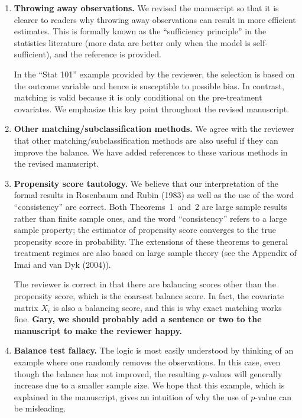 \documentclass[11pt]{article}
\begin{document}
\begin{enumerate}
\item {\bf Throwing away observations.} We revised the manuscript so
  that it is clearer to readers why throwing away observations can
  result in more efficient estimates. This is formally known as the
  ``sufficiency principle'' in the statistics literature (more data
  are better only when the model is self-sufficient), and the
  reference is provided.

  In the ``Stat 101'' example provided by the reviewer, the selection
  is based on the outcome variable and hence is susceptible to
  possible bias. In contrast, matching is valid because it is only
  conditional on the pre-treatment covariates. We emphasize this key
  point throughout the revised manuscript.

\item {\bf Other matching/subclassification methods.} We agree with
  the reviewer that other matching/subclassification methods are also
  useful if they can improve the balance. We have added references to
  these various methods in the revised manuscript.

\item {\bf Propensity score tautology.} We believe that our
  interpretation of the formal results in Rosenbaum and Rubin (1983)
  as well as the use of the word ``consistency'' are correct. Both
  Theorems~1~and~2 are large sample results rather than finite sample
  ones, and the word ``consistency'' refers to a large sample
  property; the estimator of propensity score converges to the true
  propensity score in probability. The extensions of these theorems to
  general treatment regimes are also based on large sample theory (see
  the Appendix of Imai and van Dyk (2004)).

  The reviewer is correct in that there are balancing scores other than
  the propensity score, which is the coarsest balance score. In fact,
  the covariate matrix $X_i$ is also a balancing score, and this is
  why exact matching works fine. {\bf Gary, we should probably add a
    sentence or two to the manuscript to make the reviewer happy.}

\item {\bf Balance test fallacy.} The logic is most easily understood
  by thinking of an example where one randomly removes the
  observations. In this case, even though the balance has not
  improved, the resulting $p$-values will generally increase due to a
  smaller sample size. We hope that this example, which is explained
  in the manuscript, gives an intuition of why the use of $p$-value
  can be misleading.

\end{enumerate}
\end{document}
